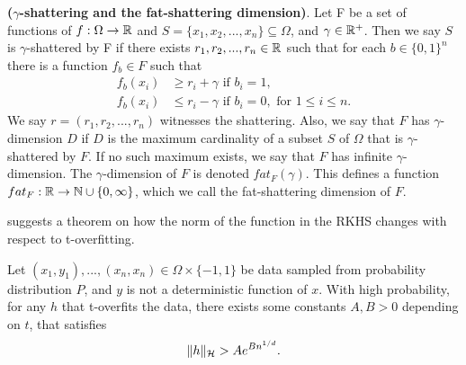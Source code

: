 \documentclass[twoside]{memoir}
\begin{document}
\begin{defn}
	\textbf{($\gamma$-shattering and the fat-shattering dimension)}.
	Let F be a set of functions of $f: \Omega \rightarrow \mathbb{R}$ and $S = \{x_1, x_2, ..., x_n\} \subseteq \Omega$, and $\gamma \in \mathbb{R}^+$. Then we say $S$ is $\gamma$-shattered by F if there exists $r_1, r_2,..., r_n \in \mathbb{R}$ such that for each $b \in \{0, 1\}^n$ there is a function $f_b \in F$ such that
	\begin{equation*}
	\begin{split}
	f_b(x_i) &\geq r_i + \gamma \text{ if } b_i = 1, \\
	f_b(x_i) &\leq r_i - \gamma \text{ if } b_i = 0, \text{ for } 1 \leq i \leq n.
	\end{split}	
	\end{equation*}
	We say $r = (r_1, r_2,..., r_n)$ witnesses the shattering.
	Also, we say that $F$ has $\gamma$-dimension $D$ if $D$ is the maximum	cardinality of a subset $S$ of $\Omega$ that is $\gamma$-shattered by $F$. If no such maximum exists, we say that $F$ has infinite $\gamma$-dimension. The $\gamma$-dimension of $F$ is denoted $fat_F(\gamma)$. This defines a function $fat_F: \mathbb{R} \rightarrow \mathbb{N} \cup \{0,\infty\}$, which we call the fat-shattering dimension of $F$.
\end{defn}

\cite{UnderstandKernel} suggests a theorem on how the norm of the function in the RKHS changes with respect to t-overfitting.
\begin{thm} \label{thm:normBound}
	Let $(x_1 ,y_1),..., (x_n,x_n) \in \Omega \times \{-1, 1\}$ be data sampled from probability distribution $P$, and $y$ is not a deterministic function of $x$. With high probability, for any $h$ that t-overfits the data, there exists some constants  $A, B > 0$ depending on $t$, that satisfies
	\[\lVert h\rVert_{\mathcal{H}} > Ae^{Bn^{1/d}}. \]
\end{thm}
\end{document}
